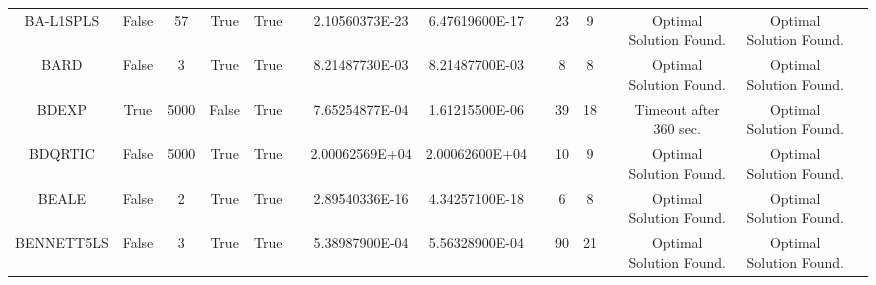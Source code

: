 \begin{longtable}{ccccccccccccccc}
	\cellcolor{default2} BA-L1SPLS& \cellcolor{default2} False& \cellcolor{default2} 57& \cellcolor{default2} True& \cellcolor{default2} True& \cellcolor{header} & \cellcolor{best} 2.10560373E-23& \cellcolor{ok} 6.47619600E-17& \cellcolor{header} & \cellcolor{poor} 23& \cellcolor{best} 9& \cellcolor{header} & \cellcolor{default2} Optimal Solution Found.& \cellcolor{default2} Optimal Solution Found.& \cellcolor{header} \\
	\cellcolor{default1} BARD& \cellcolor{default1} False& \cellcolor{default1} 3& \cellcolor{default1} True& \cellcolor{default1} True& \cellcolor{header} & \cellcolor{ok} 8.21487730E-03& \cellcolor{best} 8.21487700E-03& \cellcolor{header} & \cellcolor{best} 8& \cellcolor{best} 8& \cellcolor{header} & \cellcolor{default1} Optimal Solution Found.& \cellcolor{default1} Optimal Solution Found.& \cellcolor{header} \\
	\cellcolor{default2} BDEXP& \cellcolor{default2} True& \cellcolor{default2} 5000& \cellcolor{default2} False& \cellcolor{default2} True& \cellcolor{header} & \cellcolor{poor} 7.65254877E-04& \cellcolor{best} 1.61215500E-06& \cellcolor{header} & \cellcolor{poor} 39& \cellcolor{best} 18& \cellcolor{header} & \cellcolor{default2} Timeout after 360 sec.& \cellcolor{default2} Optimal Solution Found.& \cellcolor{header} \\
	\cellcolor{default1} BDQRTIC& \cellcolor{default1} False& \cellcolor{default1} 5000& \cellcolor{default1} True& \cellcolor{default1} True& \cellcolor{header} & \cellcolor{best} 2.00062569E+04& \cellcolor{ok} 2.00062600E+04& \cellcolor{header} & \cellcolor{ok} 10& \cellcolor{best} 9& \cellcolor{header} & \cellcolor{default1} Optimal Solution Found.& \cellcolor{default1} Optimal Solution Found.& \cellcolor{header} \\
	\cellcolor{default2} BEALE& \cellcolor{default2} False& \cellcolor{default2} 2& \cellcolor{default2} True& \cellcolor{default2} True& \cellcolor{header} & \cellcolor{ok} 2.89540336E-16& \cellcolor{best} 4.34257100E-18& \cellcolor{header} & \cellcolor{best} 6& \cellcolor{ok} 8& \cellcolor{header} & \cellcolor{default2} Optimal Solution Found.& \cellcolor{default2} Optimal Solution Found.& \cellcolor{header} \\
	\cellcolor{default1} BENNETT5LS& \cellcolor{default1} False& \cellcolor{default1} 3& \cellcolor{default1} True& \cellcolor{default1} True& \cellcolor{header} & \cellcolor{best} 5.38987900E-04& \cellcolor{ok} 5.56328900E-04& \cellcolor{header} & \cellcolor{poor} 90& \cellcolor{best} 21& \cellcolor{header} & \cellcolor{default1} Optimal Solution Found.& \cellcolor{default1} Optimal Solution Found.& \cellcolor{header} \\

\end{longtable}
